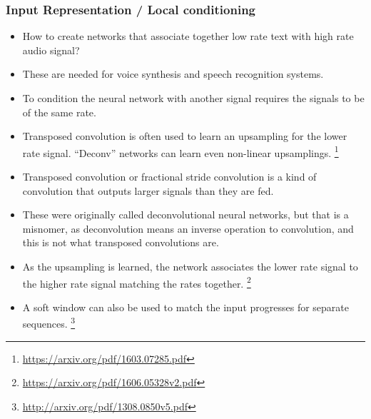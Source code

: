 \documentclass[8pt]{beamer}
\begin{document}
\begin{frame}
\frametitle{Input Representation / Local conditioning}
 \begin{itemize}
  \item How to create networks that associate together low rate text with high rate audio signal?
  \item These are needed for voice synthesis and speech recognition systems.
  \item To condition the neural network with another signal requires the signals to be of the same rate.
  \item Transposed convolution is often used to learn an upsampling for the lower rate signal. ``Deconv'' networks can learn even non-linear upsamplings.
        \footnote{\href{https://arxiv.org/pdf/1603.07285.pdf}
                       {https://arxiv.org/pdf/1603.07285.pdf}}
  \item Transposed convolution or fractional stride convolution is a kind of convolution that outputs larger signals than they are fed.
  \item These were originally called deconvolutional neural networks, but that is a misnomer, as deconvolution means an inverse operation to convolution,
        and this is not what transposed convolutions are.
  \item As the upsampling is learned, the network associates the lower rate signal to the higher rate signal matching the rates together.
        \footnote{\href{https://arxiv.org/pdf/1606.05328v2.pdf}
                       {https://arxiv.org/pdf/1606.05328v2.pdf}}
  \item A soft window can also be used to match the input progresses for separate sequences.
        \footnote{\href{http://arxiv.org/pdf/1308.0850v5.pdf}
                       {http://arxiv.org/pdf/1308.0850v5.pdf}}
 \end{itemize}
\end{frame}
\end{document}
